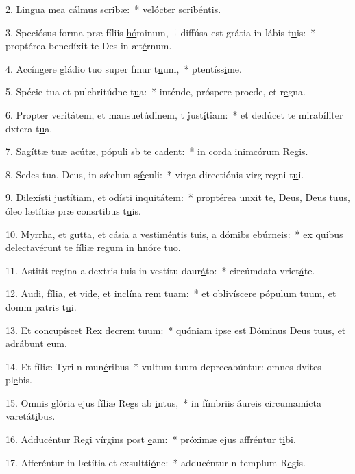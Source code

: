 2. Lingua mea cálmus scr\uline{i}bæ:~* velócter scrib\uline{é}ntis.\par 
3. Speciósus forma præ fíliis \uline{hó}minum,~† diffúsa est grátia in lábis t\uline{u}is:~* proptérea benedíxit te Des in æt\uline{é}rnum.\par 
4. Accíngere gládio tuo super fmur t\uline{u}um,~* ptentíss\uline{i}me.\par 
5. Spécie tua et pulchritúdne t\uline{u}a:~* inténde, próspere procde, et r\uline{e}gna.\par 
6. Propter veritátem, et mansuetúdinem, t just\uline{í}tiam:~* et dedúcet te mirabíliter dxtera t\uline{u}a.\par 
7. Sagíttæ tuæ acútæ, pópuli sb te c\uline{a}dent:~* in corda inimcórum R\uline{e}gis.\par 
8. Sedes tua, Deus, in sǽclum s\uline{ǽ}culi:~* virga directiónis virg regni t\uline{u}i.\par 
9. Dilexísti justítiam, et odísti inquit\uline{á}tem:~* proptérea unxit te, Deus, Deus tuus, óleo lætítiæ præ consrtibus t\uline{u}is.\par 
10. Myrrha, et gutta, et cásia a vestiméntis tuis, a dómibs eb\uline{ú}rneis:~* ex quibus delectavérunt te fíliæ regum in hnóre t\uline{u}o.\par 
11. Astitit regína a dextris tuis in vestítu daur\uline{á}to:~* circúmdata vriet\uline{á}te.\par 
12. Audi, fília, et vide, et inclína rem t\uline{u}am:~* et oblivíscere pópulum tuum, et domm patris t\uline{u}i.\par 
13. Et concupíscet Rex decrem t\uline{u}um:~* quóniam ipse est Dóminus Deus tuus, et adrábunt \uline{e}um.\par 
14. Et fíliæ Tyri n mun\uline{é}ribus~* vultum tuum deprecabúntur: omnes dvites pl\uline{e}bis.\par 
15. Omnis glória ejus fíliæ Regs ab \uline{i}ntus,~* in fímbriis áureis circumamícta varetát\uline{i}bus.\par 
16. Adducéntur Regi vírgins post \uline{e}am:~* próximæ ejus affréntur t\uline{i}bi.\par 
17. Afferéntur in lætítia et exsultti\uline{ó}ne:~* adducéntur n templum R\uline{e}gis.\par 
